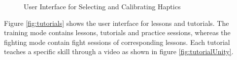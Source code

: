 \begin{figure}
    \centering
   \quad 
    \caption{User Interface for Selecting and Calibrating Haptics} 
    \label{fig:hapticScreen}
\end{figure}

Figure \ref{fig:tutorials} shows the user interface for lessons and tutorials. The training mode contains lessons, tutorials and practice sessions, whereas the fighting mode contain fight sessions of corresponding lessons. Each tutorial teaches a specific skill through a video as shown in figure \ref{fig:tutorialUnity}. 

